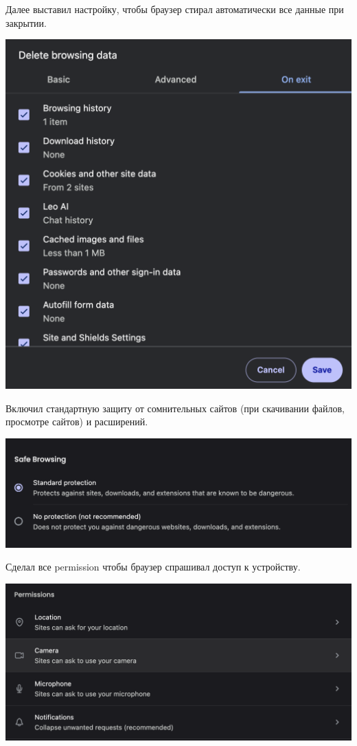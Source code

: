 \documentclass{article}
\begin{document}
Далее выставил настройку, чтобы браузер стирал автоматически все данные при закрытии.

\begin{center}
  \includegraphics[width=.9\textwidth]{2}
\end{center}

Включил стандартную защиту от сомнительных сайтов (при скачивании файлов, просмотре сайтов) и расширений.

\begin{center}
  \includegraphics[width=.9\textwidth]{3}
\end{center}

Сделал все permission чтобы браузер спрашивал доступ к устройству.

\begin{center}
  \includegraphics[width=.9\textwidth]{4}
\end{center}
\end{document}
